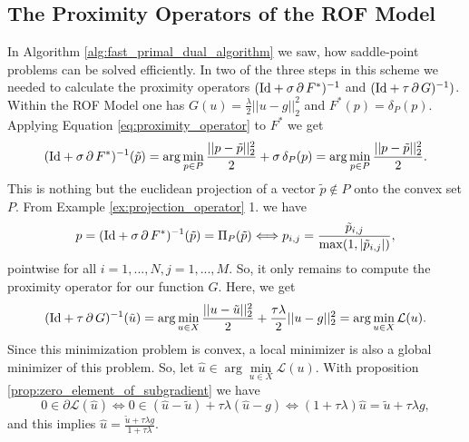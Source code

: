
    \subsection{The Proximity Operators of the ROF Model} %
    \label{sub:the_proximity_operators_for_the_rof_model}

        In Algorithm \ref{alg:fast_primal_dual_algorithm} we saw, how saddle-point problems can be solved efficiently. In two of the three steps in this scheme we needed to calculate the proximity operators $(\textnormal{Id} + \sigma\,\partial\,F^{\ast})^{-1}$ and $(\textnormal{Id} + \tau\,\partial\,G)^{-1})$. Within the ROF Model one has $G(u) = \frac{\lambda}{2} ||u - g||_{2}^{2}$ and $F^{\ast}(p) = \delta_{P}(p)$. Applying Equation \ref{eq:proximity_operator} to $F^{\ast}$ we get
            $$
                (\textnormal{Id} + \sigma\,\partial\,F^{\ast})^{-1}(\tilde{p}) = \arg \min_{p \in P} \frac{||p - \tilde{p}||_{2}^{2}}{2} + \sigma\,\delta_{P}(p) = \arg \min_{p \in P} \frac{||p - \tilde{p}||_{2}^{2}}{2}.
            $$
        This is nothing but the euclidean projection of a vector $\tilde{p} \notin P$ onto the convex set $P$. From Example \ref{ex:projection_operator} 1. we have
            \begin{equation}
                p = (\textnormal{Id} + \sigma\,\partial\,F^{\ast})^{-1}(\tilde{p}) = \Pi_{P}(\tilde{p}) \Longleftrightarrow p_{i,j} = \frac{\tilde{p}_{i, j}}{\max(1, |\tilde{p}_{i, j}|)},
            \label{eq:proximity_operator_f_star_rof}
            \end{equation}
        pointwise for all $i = 1, ..., N, j = 1, ..., M$. So, it only remains to compute the proximity operator for our function $G$. Here, we get
            $$
                (\textnormal{Id} + \tau\,\partial\,G)^{-1}(\tilde{u}) = \arg \min_{u \in X} \frac{||u - \tilde{u}||_{2}^{2}}{2} + \frac{\tau\lambda}{2} ||u - g||_{2}^{2} = \arg \min_{u \in X} \mathcal{L}(u).
            $$
        Since this minimization problem is convex, a local minimizer is also a global minimizer of this problem. So, let $\hat{u} \in \arg \min\limits_{u \in X} \mathcal{L}(u)$. With proposition \ref{prop:zero_element_of_subgradient} we have
            $$
                0 \in \partial \mathcal{L}(\hat{u}) \Longleftrightarrow 0 \in (\hat{u} - \tilde{u}) + \tau\lambda (\hat{u} - g) \Longleftrightarrow (1 + \tau\lambda)\hat{u} = \tilde{u} + \tau\lambda g,
            $$
        and this implies $\hat{u} = \frac{\tilde{u} + \tau\lambda g}{1 + \tau\lambda}$.


